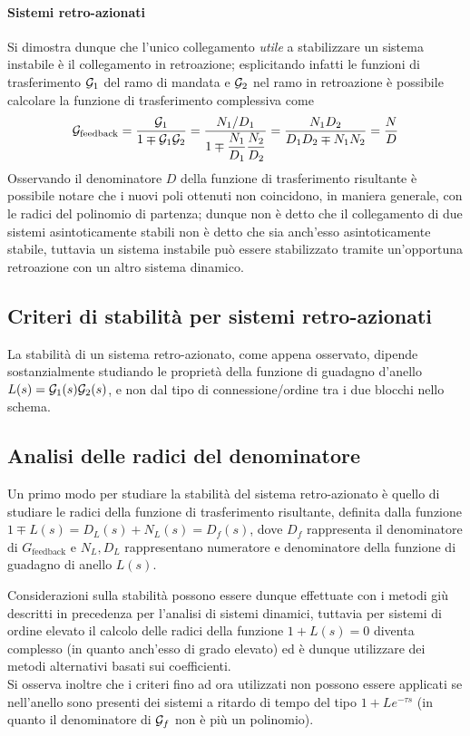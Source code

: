 	\paragraph{Sistemi retro-azionati} Si dimostra dunque che l'unico collegamento \textit{utile} a stabilizzare un sistema instabile è il collegamento in retroazione; esplicitando infatti le funzioni di trasferimento $\mathcal G_1$ del ramo di mandata e $\mathcal G_2$ nel ramo in retroazione è possibile calcolare la funzione di trasferimento complessiva come
	\[ \mathcal G_\textrm{feedback} = \frac{\mathcal G_1}{1\mp \mathcal G_1\mathcal G_2} = \frac{N_1/D_1}{1 \mp \dfrac{N_1}{D_1}\dfrac{N_2}{D_2}} = \frac{N_1D_2}{D_1D_2 \mp N_1N_2} = \frac N D \]
	Osservando il denominatore $D$ della funzione di trasferimento risultante è possibile notare che i nuovi poli ottenuti non coincidono, in maniera generale, con le radici del polinomio di partenza; dunque non è detto che il collegamento di due sistemi asintoticamente stabili non è detto che sia anch'esso asintoticamente stabile, tuttavia un sistema instabile può essere stabilizzato tramite un'opportuna retroazione con un altro sistema dinamico.
	
	\subsection*{Criteri di stabilità per sistemi retro-azionati}
		La stabilità di un sistema retro-azionato, come appena osservato, dipende sostanzialmente studiando le proprietà della funzione di guadagno d'anello $L(s) = \mathcal G_1(s)\mathcal G_2(s)$, e non dal tipo di connessione/ordine tra i due blocchi nello schema.
	
	\subsection{Analisi delle radici del denominatore}
		Un primo modo per studiare la stabilità del sistema retro-azionato è quello di studiare le radici della funzione di trasferimento risultante, definita dalla funzione $1\mp L(s) = D_L(s) + N_L(s) = D_f(s)$, dove $D_f$ rappresenta il denominatore di $G_\textrm{feedback}$ e $N_L,D_L$ rappresentano numeratore e denominatore della funzione di guadagno di anello $L(s)$.
		
		Considerazioni sulla stabilità possono essere dunque effettuate con i metodi giù descritti in precedenza per l'analisi di sistemi dinamici, tuttavia per sistemi di ordine elevato il calcolo delle radici della funzione $ 1 + L(s) = 0$ diventa complesso (in quanto anch'esso di grado elevato) ed è dunque utilizzare dei metodi alternativi basati sui coefficienti.\\
		Si osserva inoltre che i criteri fino ad ora utilizzati non possono essere applicati se nell'anello sono presenti dei sistemi a ritardo di tempo del tipo $1 + L e^{-\tau s}$ (in quanto il denominatore di $\mathcal G_f$ non è più un polinomio).
	
